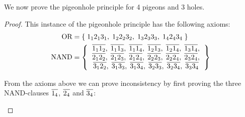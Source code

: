 We now prove the pigeonhole principle for 4 pigeons and 3 holes.
\begin{proof}
This instance of the pigeonhole principle has the following axioms:
\begin{align}
  \begin{split}
    \text{OR} &= \{ \; 1_12_13_1,\; 1_22_23_2,\; 1_32_33_3,\; 1_42_43_4 \; \}\\
    \text{NAND} &= \left \{
    \begin{tabular}{c}
      $\ol{1_11_2},\;\ol{1_11_3},\;\ol{1_11_4},\;\ol{1_21_3},\;\ol{1_21_4},\;\ol{1_31_4},$\\
      $\ol{2_12_2},\;\ol{2_12_3},\;\ol{2_12_4},\;\ol{2_22_3},\;\ol{2_22_4},\;\ol{2_32_4},$\\
      $\ol{3_12_2},\;\ol{3_13_3},\;\ol{3_13_4},\;\ol{3_23_3},\;\ol{3_23_4},\;\ol{3_33_4}$
    \end{tabular}
    \right \}
  \end{split}
  \label{eq:ax_pigeon}
\end{align}

From the axioms above we can prove inconsistency by first proving the three NAND-clauses $\ol{1_4}$, $\ol{2_4}$ and $\ol{3_4}$:\par
\begin{figure}[!h]
  \centering
  \begin{prooftree*}[separation=0.8em, rule margin=1ex]
  \end{prooftree*}
  \caption{}
  \label{fig:proof_14}
\end{figure}

\begin{figure}[!h]
  \centering
  \begin{prooftree*}[separation=0.8em, rule margin=1ex]
  \end{prooftree*}
  \caption{}
  \label{fig:proof_24}
\end{figure}


\end{proof}
